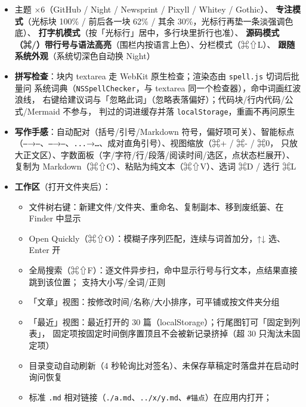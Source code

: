 \documentclass[11pt,a4paper]{ctexart}
\begin{document}
\begin{itemize}
原文仍是唯一真源：DOM 里改的每个字按「文本前后最小差异」翻回 \texttt{raw} 再重画，
\texttt{serialize(parse(src)) === src} 不变；撤销 / 自动配对 / 智能标点 / 表情补全 / \texttt{⌘B} 这些
一律照旧（编辑面装了一套与 textarea 同名的 \texttt{.value} / \texttt{.selectionStart} 接口）。
\textbf{代码、行内代码、链接、公式、行内 HTML、表格、任务框、多行段落}这类「标记里装着真内容」
或结构复杂的块自动退回源码态 —— 藏了反而没法改
\item 主题 ×6（GitHub / Night / Newsprint / Pixyll / Whitey / Gothic）、
\textbf{专注模式}（光标块 100\% / 前后各一块 62\% / 其余 30\%，光标行再垫一条淡强调色底）、
\textbf{打字机模式}（按「光标行」居中，多行块里折行也准）、
\textbf{源码模式（⌘/）带行号与语法高亮}（围栏内按语言上色）、分栏模式（⌘⇧L）、
\textbf{跟随系统外观}（系统切深色自动换 Night）
\item \textbf{拼写检查}：块内 textarea 走 WebKit 原生检查；渲染态由 \texttt{spell.js} 切词后批量问
系统词典（\texttt{NSSpellChecker}，与 textarea 同一个检查器），命中词画红波浪线，
右键给建议词与「忽略此词」（忽略表落偏好）；代码块/行内代码/公式/Mermaid 不参与，
判过的词进缓存并落 \texttt{localStorage}，重画不再问原生
\item \textbf{写作手感}：自动配对（括号/引号/Markdown 符号，偏好项可关）、智能标点
（\texttt{--}→\texttt{–}、\texttt{---}→\texttt{—}、\texttt{...}→\texttt{…}、成对直角引号）、视图缩放（⌘+ / ⌘- / ⌘0，
只放大正文区）、字数面板（字/字符/行/段落/阅读时间/选区，点状态栏展开）、
复制为 Markdown（⌘⇧C）、粘贴为纯文本（⌘⇧V）、选词 ⌘D / 选行 ⌘L
\item \textbf{工作区}（打开文件夹后）：
\begin{itemize}
\item 文件树右键：新建文件/文件夹、重命名、复制副本、移到废纸篓、在 Finder 中显示
\item Open Quickly（⌘⇧O）：模糊子序列匹配，连续与词首加分，↑↓ 选、Enter 开
\item 全局搜索（⌘⇧F）：逐文件异步扫，命中显示行号与行文本，点结果直接跳到该位置；
支持大小写/全词/正则
\item 「文章」视图：按修改时间/名称/大小排序，可平铺或按文件夹分组
\item 「最近」视图：最近打开的 30 篇（localStorage）；行尾图钉可「固定到列表」，
固定项按固定时间倒序置顶且不会被新记录挤掉（超 30 只淘汰未固定项）
\item 目录变动自动刷新（4 秒轮询比对签名）、未保存草稿定时落盘并在启动时询问恢复
\item 标准 \texttt{.md} 相对链接（\texttt{./a.md}、\texttt{../x/y.md}、\texttt{\#锚点}）在应用内打开；

\end{itemize}
\end{itemize}
\end{document}
